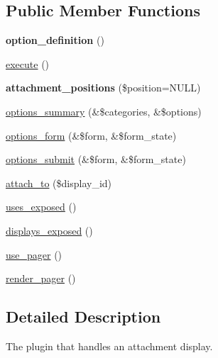 \subsection*{Public Member Functions}
\begin{DoxyCompactItemize}
\item 
\hypertarget{classviews__plugin__display__attachment_afd104a6bde92eab82cd1a8e1b654179f}{
{\bfseries option\_\-definition} ()}
\label{classviews__plugin__display__attachment_afd104a6bde92eab82cd1a8e1b654179f}

\item 
\hyperlink{classviews__plugin__display__attachment_a5ca7a4fec7907cd236d0f73ac21f4e1e}{execute} ()
\item 
\hypertarget{classviews__plugin__display__attachment_a3175bc94ea0fc7d796bec4670317ab23}{
{\bfseries attachment\_\-positions} (\$position=NULL)}
\label{classviews__plugin__display__attachment_a3175bc94ea0fc7d796bec4670317ab23}

\item 
\hyperlink{classviews__plugin__display__attachment_a0d54f6bd68c3ebba7af03cd7ac722fe0}{options\_\-summary} (\&\$categories, \&\$options)
\item 
\hyperlink{classviews__plugin__display__attachment_a82864b279fb83e8d9ebddc40bc2851fa}{options\_\-form} (\&\$form, \&\$form\_\-state)
\item 
\hyperlink{classviews__plugin__display__attachment_a63219dfd2bfed59bdf1840d704d11799}{options\_\-submit} (\&\$form, \&\$form\_\-state)
\item 
\hyperlink{classviews__plugin__display__attachment_ae8fcfc681cc9ff841ac5c0bdf1691b31}{attach\_\-to} (\$display\_\-id)
\item 
\hyperlink{classviews__plugin__display__attachment_af62963a58736c80a5750c87588fb093a}{uses\_\-exposed} ()
\item 
\hyperlink{classviews__plugin__display__attachment_aa047b05c7d1e48bd2ec6c98a27720ebf}{displays\_\-exposed} ()
\item 
\hyperlink{classviews__plugin__display__attachment_a0a08a465f715c107a2dfaf9bd5dd1538}{use\_\-pager} ()
\item 
\hyperlink{classviews__plugin__display__attachment_aecc79a155c6491a0c510568b07c97fb8}{render\_\-pager} ()
\end{DoxyCompactItemize}


\subsection{Detailed Description}
The plugin that handles an attachment display.

